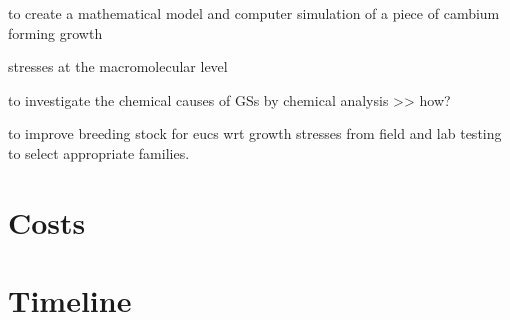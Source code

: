 \documentclass{article}
\begin{document}
to create a mathematical model and computer simulation of a piece of cambium forming growth

stresses at the macromolecular level

to investigate the chemical causes of GSs by chemical analysis >> how?

to improve breeding stock for eucs wrt growth stresses from field and lab testing to select appropriate families.

\section{Costs}

\section{Timeline}
\end{document}

